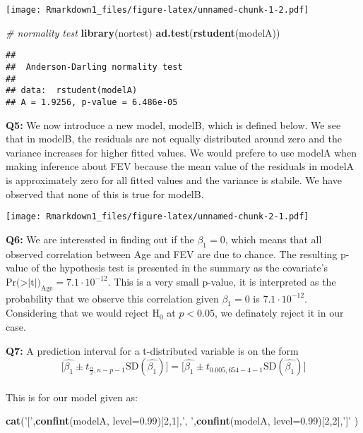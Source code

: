 \documentclass[]{article}
\newenvironment{Shaded}{\begin{snugshade}}{\end{snugshade}}
\newcommand{\KeywordTok}[1]{\textcolor[rgb]{0.13,0.29,0.53}{\textbf{#1}}}
\newcommand{\DataTypeTok}[1]{\textcolor[rgb]{0.13,0.29,0.53}{#1}}
\newcommand{\DecValTok}[1]{\textcolor[rgb]{0.00,0.00,0.81}{#1}}
\newcommand{\FloatTok}[1]{\textcolor[rgb]{0.00,0.00,0.81}{#1}}
\newcommand{\StringTok}[1]{\textcolor[rgb]{0.31,0.60,0.02}{#1}}
\newcommand{\CommentTok}[1]{\textcolor[rgb]{0.56,0.35,0.01}{\textit{#1}}}
\newcommand{\NormalTok}[1]{#1}
\begin{document}
\texttt{[image: Rmarkdown1\_files/figure-latex/unnamed-chunk-1-2.pdf]}

\begin{Shaded}
\begin{Highlighting}[]
\CommentTok{# normality test}
\KeywordTok{library}\NormalTok{(nortest) }
\KeywordTok{ad.test}\NormalTok{(}\KeywordTok{rstudent}\NormalTok{(modelA))}
\end{Highlighting}
\end{Shaded}

\begin{verbatim}
## 
##  Anderson-Darling normality test
## 
## data:  rstudent(modelA)
## A = 1.9256, p-value = 6.486e-05
\end{verbatim}

\textbf{Q5:} We now introduce a new model, modelB, which is defined
below. We see that in modelB, the residuals are not equally distributed
around zero and the variance increases for higher fitted values. We
would prefere to use modelA when making inference about FEV because the
mean value of the residuals in modelA is approximately zero for all
fitted values and the variance is stabile. We have observed that none of
this is true for modelB.

\texttt{[image: Rmarkdown1\_files/figure-latex/unnamed-chunk-2-1.pdf]}

\textbf{Q6:} We are interessted in finding out if the \(\beta_1 = 0\),
which means that all observed correlation between Age and FEV are due to
chance. The resulting p-value of the hypothesis test is presented in the
summary as the covariate's
\(\text{Pr(>|t|)}_{\text{Age}} = 7.1\cdot 10^{-12}\). This is a very
small p-value, it is interpreted as the probability that we observe this
correlation given \(\beta_1 = 0\) is \(7.1 \cdot 10^{-12}\). Considering
that we would reject \(\text{H}_0\) at \(p < 0.05\), we definately
reject it in our case.

\textbf{Q7:} A prediction interval for a t-distributed variable is on
the form
\[\Bigg[ \hat{\beta_1} \pm t_{\frac{\alpha}{2}, n-p-1}\text{SD}(\hat{\beta_1}) \Bigg] = \Bigg[ \hat{\beta_1} \pm t_{0.005,654-4-1}\text{SD}(\hat{\beta_1}) \Bigg] \]\\
This is for our model given as:

\begin{Shaded}
\begin{Highlighting}[]
\KeywordTok{cat}\NormalTok{(}\StringTok{'['}\NormalTok{,}\KeywordTok{confint}\NormalTok{(modelA, }\DataTypeTok{level=}\FloatTok{0.99}\NormalTok{)[}\DecValTok{2}\NormalTok{,}\DecValTok{1}\NormalTok{],}\StringTok{', '}\NormalTok{,}\KeywordTok{confint}\NormalTok{(modelA, }\DataTypeTok{level=}\FloatTok{0.99}\NormalTok{)[}\DecValTok{2}\NormalTok{,}\DecValTok{2}\NormalTok{],}\StringTok{']'}\NormalTok{ )}
\end{Highlighting}
\end{Shaded}
\end{document}
